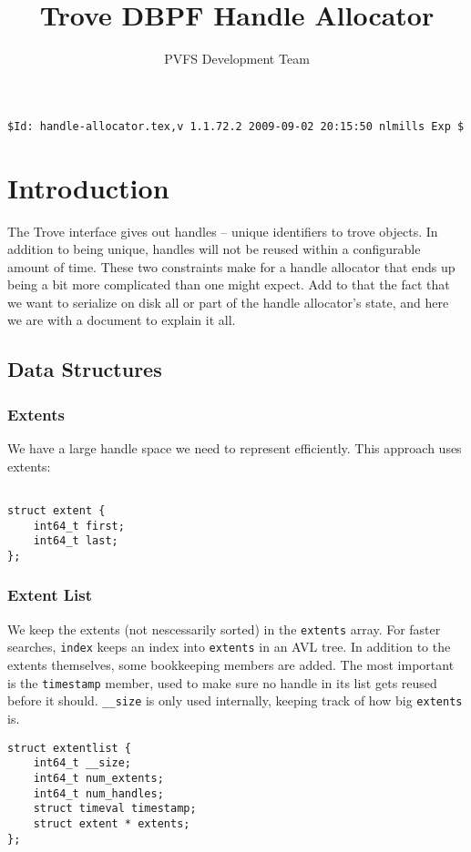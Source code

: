\documentclass[10pt]{article} %
\title{Trove DBPF Handle Allocator }
\author{PVFS Development Team}
\begin{document}
\maketitle
\begin{verbatim}$Id: handle-allocator.tex,v 1.1.72.2 2009-09-02 20:15:50 nlmills Exp $\end{verbatim}

\section{Introduction}

The Trove interface gives out handles -- unique identifiers to trove
objects.  In addition to being unique, handles will not be reused within
a configurable amount of time.  These two constraints make for a handle
allocator that ends up being a bit more complicated than one might
expect.  Add to that the fact that we want to serialize on disk all or
part of the handle allocator's state, and here we are with a document to
explain it all.

\subsection{Data Structures}
\subsubsection{Extents}
We have a large handle space we need to represent efficiently.  This
approach uses extents:
\begin{verbatim}

struct extent {
	int64_t first;
	int64_t last;
};

\end{verbatim}

\subsubsection{Extent List}
We keep the extents (not nescessarily sorted) in the \texttt{extents}
array.  For faster searches, \texttt{index} keeps an index into
\texttt{extents} in an AVL tree. 
In addition
to the extents themselves, some bookkeeping members are added.  The most
important is the \texttt{timestamp} member, used to make sure no handle in
its list gets reused before it should.  \texttt{\_\_size} is only used
internally, keeping track of how big \texttt{extents} is.  

\begin{verbatim}
struct extentlist {
	int64_t __size;
	int64_t num_extents;
	int64_t num_handles;
	struct timeval timestamp;
	struct extent * extents;
};
\end{verbatim}
\end{document}
